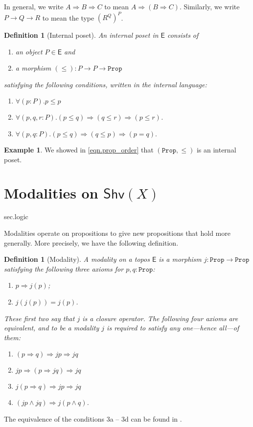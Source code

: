 \documentclass[reqno,11pt]{amsproc}
\theoremstyle{plain}
\newtheorem{definition}[theorem]{Definition}
\theoremstyle{definition}
\newtheorem{example}[theorem]{Example}
\newcommand{\Const}[1]{\mathtt{#1}}
\newcommand{\cat}[1]{\mathsf{#1}}
\renewcommand{\to}[1][]{\xrightarrow{#1}}
\newcommand{\shv}{\cat{Shv}}
\newcommand{\prop}{\Const{Prop}}
\newcommand{\imp}{\Rightarrow}
\numberwithin{equation}{section}
\begin{document}
In general, we write $A\imp B\imp C$ to mean $A\imp(B\imp C)$. Similarly, we write $P\to Q\to R$ to mean the type $(R^Q)^P$.

\begin{definition}[Internal poset]\label{def.internal_poset}
An \emph{internal poset} in $\cat{E}$ consists of
\begin{enumerate}
	\item an object $P\in\cat{E}$ and
	\item a morphism $(\leq)\colon P\to P\to\prop$
\end{enumerate}
satisfying the following conditions, written in the internal language:
\begin{enumerate}[label=\alph*.]
	\item $\forall (p:P).p\leq p$
	\item $\forall (p,q,r:P).(p\leq q)\imp (q\leq r)\imp(p\leq r)$.
	\item $\forall (p,q:P).(p\leq q)\imp(q\leq p)\imp (p=q).$
\end{enumerate}
\end{definition}

\begin{example}
We showed in \cref{eqn.prop_order} that $(\prop,\leq)$ is an internal poset.
\end{example}

\section{Modalities on $\shv(X)$}\label{sec.modalities}sec.logic

Modalities operate on propositions to give new propositions that hold more generally. More precisely, we have the following definition. 

\begin{definition}[Modality]\label{def.modality}
A \emph{modality} on a topos $\cat{E}$ is a morphism $j\colon\prop\to\prop$ satisfying the following three axioms for $p,q:\prop$:
\begin{enumerate}
	\item $p\imp j(p)$;
	\item $j(j(p))=j(p)$.
\end{enumerate}
These first two say that $j$ is a \emph{closure operator}. The following four axioms are equivalent, and to be a modality $j$ is required to satisfy any one---hence all---of them:
\begin{enumerate}[label=3\alph*.]
  \item $(p\imp q)\imp jp\imp jq$
  \item $jp\imp(p\imp jq)\imp jq$
  \item $j(p\imp q)\imp jp\imp jq$
  \item $(jp\wedge jq)\imp j(p\wedge q)$.
\end{enumerate}
\end{definition}
The equivalence of the conditions 3a -- 3d can be found in \cite[Lemma 4.6]{schultz2019temporal}.
\end{document}
